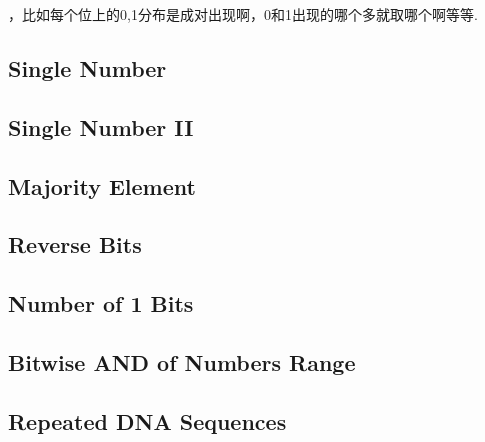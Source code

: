 
，比如每个位上的0,1分布是成对出现啊，0和1出现的哪个多就取哪个啊等等.    
\subsection{Single Number}

\subsection{Single Number II}

\subsection{Majority Element}

\subsection{Reverse Bits}

\subsection{Number of 1 Bits}

\subsection{Bitwise AND of Numbers Range}

\subsection{Repeated DNA Sequences}

